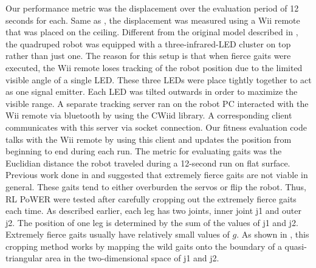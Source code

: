 Our performance metric was the displacement over the evaluation period of 12 seconds
for each. Same as \cite{yosinski2011evolving-robot-gaits}, the displacement was
measured using a Wii remote that was placed on the ceiling. Different
from the original model described in \cite{yosinski2011evolving-robot-gaits}, the quadruped robot was
equipped with a three-infrared-LED cluster on top rather than just
one. The reason for this setup is that when fierce gaits were
executed, the Wii remote loses tracking of the robot position due to
the limited visible angle of a single LED.  These three LEDs were
place tightly together to act as one signal emitter. Each LED was
tilted outwards in order to maximize the visible range. A
separate tracking server ran on the robot PC interacted with the Wii
remote via bluetooth by using the CWiid library.  A corresponding
client communicates with this server via socket connection. Our
fitness evaluation code talks with the Wii remote by using this client
and updates the position from beginning to end during each run. The
metric for evaluating gaits was the Euclidian distance the robot
traveled during a 12-second run on flat surface. Previous work done in
\cite{yosinski2011evolving-robot-gaits} and \cite{clune2009evolving-coordinated-quadruped} suggested that extremely fierce gaits are not viable in
general. These gaits tend to either overburden the servos or flip the
robot.  Thus, RL PoWER were tested after carefully cropping out the
extremely fierce gaits each time. As described earlier, each leg has
two joints, inner joint j1 and outer j2. The position of one leg is
determined by the sum of the values of j1 and j2. Extremely fierce
gaits usually have relatively small values of $g$. As shown in , this cropping method works
by mapping the wild gaits onto the boundary of a quasi-triangular area in
the two-dimensional space of j1 and j2.


